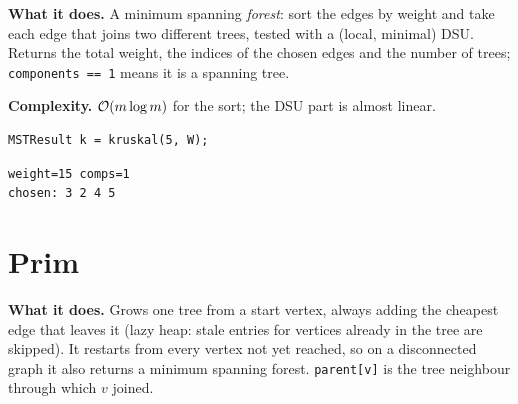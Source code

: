 \textbf{What it does.} A minimum spanning \emph{forest}: sort the edges by weight and take each edge that joins two different trees, tested with a (local, minimal) DSU. Returns the total weight, the indices of the chosen edges and the number of trees; \texttt{components == 1} means it is a spanning tree.

\textbf{Complexity.} $\mathcal{O}(m\log m)$ for the sort; the DSU part is almost linear.

\begin{diagrambox}
\end{diagrambox}

\begin{lstlisting}[style=snippet]
MSTResult k = kruskal(5, W);
\end{lstlisting}
\begin{lstlisting}[style=trace]
weight=15 comps=1
chosen: 3 2 4 5
\end{lstlisting}



\clneed
\section{Prim}
\label{sec:cl-prim}

\textbf{What it does.} Grows one tree from a start vertex, always adding the cheapest edge that leaves it (lazy heap: stale entries for vertices already in the tree are skipped). It restarts from every vertex not yet reached, so on a disconnected graph it also returns a minimum spanning forest. \texttt{parent[v]} is the tree neighbour through which $v$ joined.

